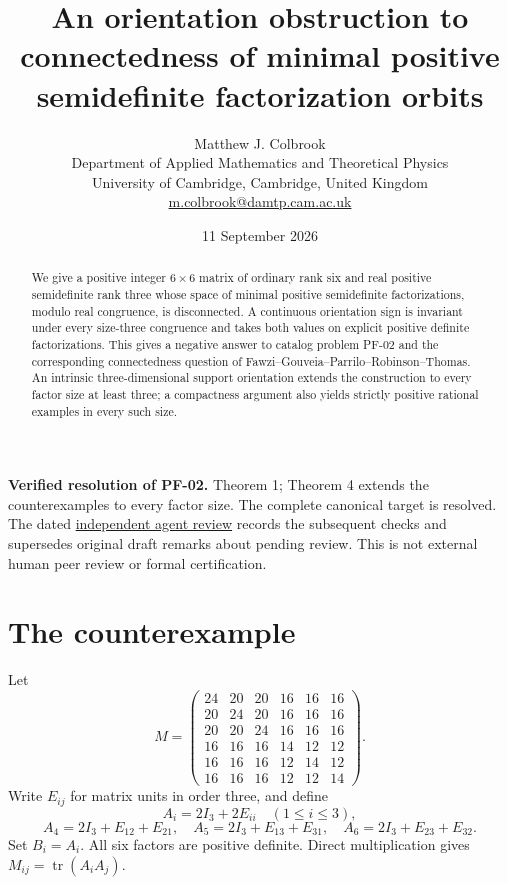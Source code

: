 \documentclass[11pt]{article}
\title{An orientation obstruction to connectedness of minimal positive semidefinite factorization orbits}
\author{Matthew J. Colbrook\\\small Department of Applied Mathematics and Theoretical Physics\\\small University of Cambridge, Cambridge, United Kingdom\\\small\href{mailto:m.colbrook@damtp.cam.ac.uk}{m.colbrook@damtp.cam.ac.uk}}\date{11 September 2026}
\newcommand{\tr}{\operatorname{tr}}
\begin{document}
\maketitle

\noindent\textbf{Verified resolution of PF-02.} Theorem 1; Theorem 4 extends the counterexamples to every factor size. The complete canonical target is resolved.
The dated \href{https://github.com/MColbrook/OpenProblemsInNLA/blob/codex/colbrook-factorization-resolutions/references/colbrook-factorization-2026-09-11/verification/reviews/PF-02-review.md}{independent agent review} records the subsequent checks and supersedes original draft remarks about pending review. This is not external human peer review or formal certification.
\par\medskip

\begin{abstract}
We give a positive integer $6\times6$ matrix of ordinary rank six and real positive semidefinite rank three whose space of minimal positive semidefinite factorizations, modulo real congruence, is disconnected. A continuous orientation sign is invariant under every size-three congruence and takes both values on explicit positive definite factorizations. This gives a negative answer to catalog problem PF-02 and the corresponding connectedness question of Fawzi--Gouveia--Parrilo--Robinson--Thomas. An intrinsic three-dimensional support orientation extends the construction to every factor size at least three; a compactness argument also yields strictly positive rational examples in every such size.
\end{abstract}

\section{The counterexample}
Let
\begin{equation}\label{eq:M}
M=\begin{pmatrix}
24&20&20&16&16&16\\
20&24&20&16&16&16\\
20&20&24&16&16&16\\
16&16&16&14&12&12\\
16&16&16&12&14&12\\
16&16&16&12&12&14
\end{pmatrix}.
\end{equation}
Write $E_{ij}$ for matrix units in order three, and define
\[
A_i=2I_3+2E_{ii}\quad(1\leq i\leq3),
\]
\[
A_4=2I_3+E_{12}+E_{21},\quad
A_5=2I_3+E_{13}+E_{31},\quad
A_6=2I_3+E_{23}+E_{32}.
\]
Set $B_i=A_i$. All six factors are positive definite. Direct multiplication gives $M_{ij}=\tr(A_iA_j)$.
\end{document}
